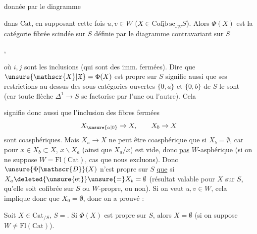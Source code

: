 
donnée par le diagramme


dans $\mathrm{Cat}$, en supposant cette fois $u,v\in W$ ($X\in\underline{\mathrm{Cofib\,sc}}_{\circ W}S$).  Alors $\Phi(X)$ est la catégorie fibrée scindée sur $S$ définie par le diagramme contravariant sur $S$

\quad,

où $i,j$ sont les inclusions (qui sont des imm. fermées). Dire que $\unsure{\mathscr{X}|\mathfrak{X}}=\Phi(X)$ est propre sur $S$ signifie aussi que ses restrictions au dessus des  sous-catégories ouvertes $\{0,a\}$ et $\{0,b\}$ de $S$ le sont (car toute flèche $\Delta^1\to S$ se factorise par l'une ou l'autre). Cela

signifie donc aussi que l'inclusion des fibres fermées
\[
X_{\unsure{a|0}}\to X,\qquad X_b\to X
\]
sont coasphériques. Mais $X_a\to X$ ne peut être coasphérique que si $X_b=\emptyset$, car pour $x\in X_b\subset X$, $x\backslash X_a$ (ainsi que $X_a/x$) est vide, donc \uline{pas} $W$-asphérique (si on ne suppose $W=\mathrm{Fl}(\mathrm{Cat})$, cas que nous excluons). Donc $\unsure{\Phi|\mathscr{D}}(X)$ n'est propre sur $S$ \uline{que} si $X_a\deleted{\unsure{\text{et}}}\unsure{=}X_b=\emptyset$ (résultat valable pour \uline{} $X$ sur $S$, qu'elle soit cofibrée sur $S$ ou $W$-propre, ou non). Si on veut $u,v\in W$, cela implique donc que $X_0=\emptyset$, donc on a prouvé :

\margin{$\vert\!\Vert$}
Soit $X\in\mathrm{Cat}_{/S}$, $S={}$. Si $\Phi(X)$ est propre
sur $S$, alors $X=\emptyset$ (si on suppose $W\ne\mathrm{Fl}(\mathrm{Cat})$).

